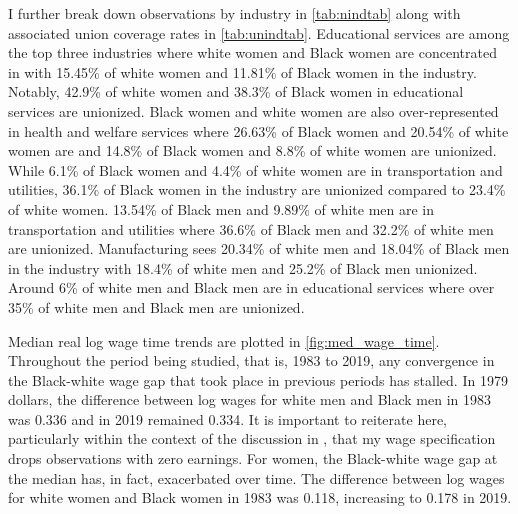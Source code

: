 \documentclass[11pt]{article}
\begin{document}
I further break down observations by industry in \autoref{tab:nindtab} along with associated union coverage rates in \autoref{tab:unindtab}. Educational services are among the top three industries where white women and Black women are concentrated in with 15.45\% of white women and 11.81\% of Black women in the industry. Notably, 42.9\% of white women and 38.3\% of Black women in educational services are unionized. Black women and white women are also over-represented in health and welfare services where 26.63\% of Black women and 20.54\% of white women are and 14.8\% of Black women and 8.8\% of white women are unionized. While 6.1\% of Black women and 4.4\% of white women are in transportation and utilities, 36.1\% of Black women in the industry are unionized compared to 23.4\% of white women. 13.54\% of Black men and 9.89\% of white men are in transportation and utilities where 36.6\% of Black men and 32.2\% of white men are unionized. Manufacturing sees 20.34\% of white men and 18.04\% of Black men in the industry with 18.4\% of white men and 25.2\% of Black men unionized. Around 6\% of white men and Black men are in educational services where over 35\% of white men and Black men are unionized. 

Median real log wage time trends are plotted in \autoref{fig:med_wage_time}. Throughout the period being studied, that is, 1983 to 2019, any convergence in the Black-white wage gap that took place in previous periods has stalled. In 1979 dollars, the difference between log wages for white men and Black men in 1983 was 0.336 and in 2019 remained 0.334. It is important to reiterate here, particularly within the context of the discussion in \citet{bayercharles2018}, that my wage specification drops observations with zero earnings. For women, the Black-white wage gap at the median has, in fact, exacerbated over time. The difference between log wages for white women and Black women in 1983 was 0.118, increasing to 0.178 in 2019. 
\end{document}
